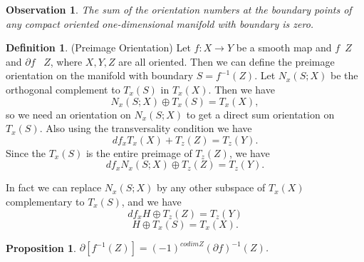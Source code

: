 \documentclass[psamsfonts]{amsart}
\newtheorem{prop}[theorem]{Proposition}
\newtheorem{obs}[theorem]{Observation}
\theoremstyle{definition}
\newtheorem{defn}[theorem]{Definition}
\theoremstyle{remark}
\numberwithin{equation}{section}
\begin{document}
		\begin{obs}
			The sum of the orientation numbers at the boundary points of any compact oriented one-dimensional manifold with boundary is zero.
		\end{obs}
		\begin{defn}(Preimage Orientation)
			Let $f: X \to Y$ be a smooth map and $f$\;\;\makebox[0pt]{$\top$}\makebox[0pt]{$\cap$}\;\ $Z$ and $\partial f$ \;\;\makebox[0pt]{$\top$}\makebox[0pt]{$\cap$}\;\ $Z$, where $X,Y,Z$ are all oriented. Then we can define the preimage orientation on the manifold with boundary $S = f^{-1}(Z)$. Let $N_x(S;X)$ be the orthogonal complement to $T_x(S)$ in $T_x(X)$. Then we have
			\begin{equation}
				N_x(S;X) \oplus T_x(S) = T_x(X),
			\end{equation}
			so we need an orientation on $N_x(S;X)$ to get a direct sum orientation on $T_x(S)$. Also using the transversality condition we have 
			\begin{equation}
				df_xT_x(X) + T_z(Z) = T_z(Y).
			\end{equation}
			Since the $T_x(S)$ is the entire preimage of $T_z(Z)$, we have
			\begin{equation}
				df_xN_x(S;X) \oplus T_z(Z) = T_z(Y).
			\end{equation}
		\end{defn}
		In fact we can replace $N_x(S;X)$ by any other subspace of $T_x(X)$ complementary to $T_x(S)$, and we have 
		\begin{equation}
			df_xH \oplus T_z(Z) = T_z(Y)
		\end{equation}
		\begin{equation}
			H \oplus T_x(S) = T_x(X).
		\end{equation}
		\begin{prop}
			$\partial[f^{-1}(Z)] = (-1)^{codim Z}(\partial f)^{-1}(Z)$.
		\end{prop}
		
\end{document}
